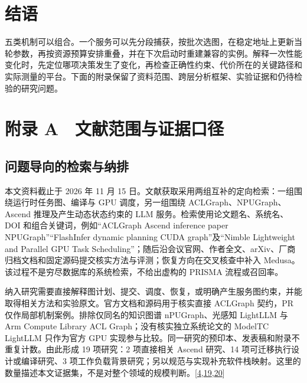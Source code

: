 \documentclass[
  UTF8,
  zihao=5]{ctexart}
\begin{document}
\hypertarget{ux7ed3ux8bed}{%
\section*{结语}\label{ux7ed3ux8bed}}

五类机制可以组合。一个服务可以先分段捕获，按批次选图，在稳定地址上更新当轮参数，再按资源预算安排重叠，并在下次启动时重建兼容的实例。解释一次性能变化时，先定位哪项决策发生了变化，再检查正确性约束、代价所在的关键路径和实际测量的平台。下面的附录保留了资料范围、跨层分析框架、实验证据和仍待检验的研究问题。

\hypertarget{ux9644ux5f55-a-ux6587ux732eux8303ux56f4ux4e0eux8bc1ux636eux53e3ux5f84}{%
\section*{附录
A　文献范围与证据口径}\label{ux9644ux5f55-a-ux6587ux732eux8303ux56f4ux4e0eux8bc1ux636eux53e3ux5f84}}

\hypertarget{ux95eeux9898ux5bfcux5411ux7684ux68c0ux7d22ux4e0eux7eb3ux6392}{%
\subsection*{问题导向的检索与纳排}\label{ux95eeux9898ux5bfcux5411ux7684ux68c0ux7d22ux4e0eux7eb3ux6392}}

本文资料截止于 2026 年 11 月 15
日。文献获取采用两组互补的定向检索：一组围绕运行时任务图、编译与 GPU
调度，另一组围绕 ACLGraph、NPUGraph、Ascend 推理及产生动态状态约束的 LLM
服务。检索使用论文题名、系统名、DOI 和组合关键词，例如``ACLGraph Ascend
inference paper NPUGraph''``FlashInfer dynamic planning CUDA
graph''及``Nimble Lightweight and Parallel GPU Task
Scheduling''；随后沿会议官网、作者全文、arXiv、厂商归档文档和固定源码提交核实方法与评测；恢复方向在交叉核查中补入
Medusa。该过程不是穷尽数据库的系统检索，不给出虚构的 PRISMA
流程或召回率。

纳入研究需要直接解释图计划、提交、调度、恢复，或明确产生服务图约束，并能取得相关方法和实验原文。官方文档和源码用于核实直接
ACLGraph 契约，PR 仅作局部机制案例。排除仅同名的知识图谱
nPUGraph、光感知 LightLLM 与 Arm Compute Library ACL
Graph；没有核实独立系统论文的 ModelTC LightLLM 只作为官方 GPU
实现参与比较。同一研究的预印本、发表稿和附录不重复计数。由此形成 19
项研究：2 项直接相关 Ascend 研究、14 项可迁移执行设计或编译研究、3
项工作负载背景研究；另以规范与实现补充软件栈映射。这里的数量描述本文证据集，不是对整个领域的规模判断。{[}\protect\hyperlink{ref-liu2025xllm}{4},\protect\hyperlink{ref-yu2026ascendfield}{19},\protect\hyperlink{ref-lightllm2026code}{20}{]}
\end{document}
